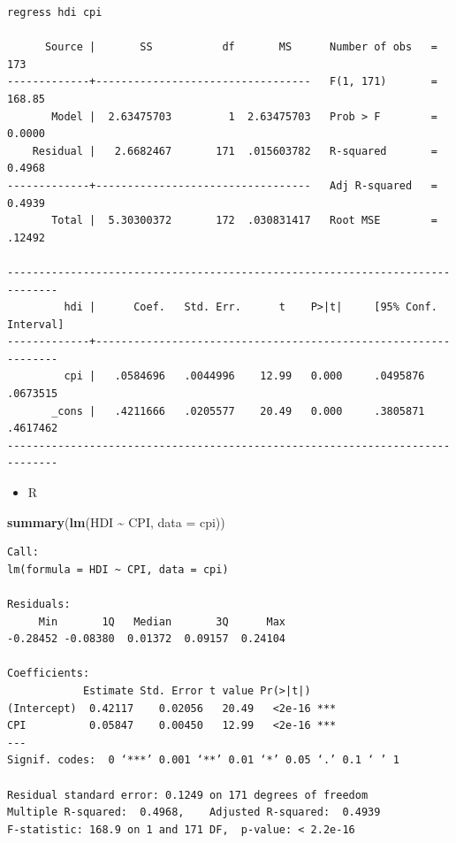 \documentclass[
]{book}
\newenvironment{Shaded}{\begin{snugshade}}{\end{snugshade}}
\newcommand{\DataTypeTok}[1]{\textcolor[rgb]{0.13,0.29,0.53}{#1}}
\newcommand{\KeywordTok}[1]{\textcolor[rgb]{0.13,0.29,0.53}{\textbf{#1}}}
\newcommand{\NormalTok}[1]{#1}
\newcommand{\OperatorTok}[1]{\textcolor[rgb]{0.81,0.36,0.00}{\textbf{#1}}}
\newcommand{\StringTok}[1]{\textcolor[rgb]{0.31,0.60,0.02}{#1}}
\providecommand{\tightlist}{%
  \setlength{\itemsep}{0pt}\setlength{\parskip}{0pt}}
\begin{document}
\begin{verbatim}
regress hdi cpi

      Source |       SS           df       MS      Number of obs   =       173
-------------+----------------------------------   F(1, 171)       =    168.85
       Model |  2.63475703         1  2.63475703   Prob > F        =    0.0000
    Residual |   2.6682467       171  .015603782   R-squared       =    0.4968
-------------+----------------------------------   Adj R-squared   =    0.4939
       Total |  5.30300372       172  .030831417   Root MSE        =    .12492

------------------------------------------------------------------------------
         hdi |      Coef.   Std. Err.      t    P>|t|     [95% Conf. Interval]
-------------+----------------------------------------------------------------
         cpi |   .0584696   .0044996    12.99   0.000     .0495876    .0673515
       _cons |   .4211666   .0205577    20.49   0.000     .3805871    .4617462
------------------------------------------------------------------------------
\end{verbatim}

\begin{itemize}
\tightlist
\item
  R
\end{itemize}

\begin{Shaded}
\begin{Highlighting}[]
\KeywordTok{summary}\NormalTok{(}\KeywordTok{lm}\NormalTok{(HDI }\OperatorTok{\textasciitilde{}}\StringTok{ }\NormalTok{CPI, }\DataTypeTok{data =}\NormalTok{ cpi))}
\end{Highlighting}
\end{Shaded}

\begin{verbatim}
Call:
lm(formula = HDI ~ CPI, data = cpi)

Residuals:
     Min       1Q   Median       3Q      Max 
-0.28452 -0.08380  0.01372  0.09157  0.24104 

Coefficients:
            Estimate Std. Error t value Pr(>|t|)    
(Intercept)  0.42117    0.02056   20.49   <2e-16 ***
CPI          0.05847    0.00450   12.99   <2e-16 ***
---
Signif. codes:  0 ‘***’ 0.001 ‘**’ 0.01 ‘*’ 0.05 ‘.’ 0.1 ‘ ’ 1

Residual standard error: 0.1249 on 171 degrees of freedom
Multiple R-squared:  0.4968,    Adjusted R-squared:  0.4939 
F-statistic: 168.9 on 1 and 171 DF,  p-value: < 2.2e-16
\end{verbatim}
\end{document}
